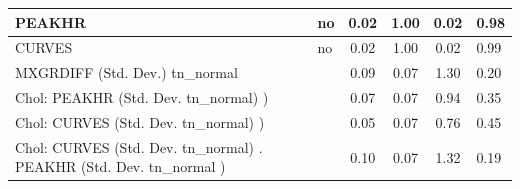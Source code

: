 \begin{table}
\begin{center}
\begin{tabular}{|l|l|c|c|c|l|}
			\hline
			PEAKHR & no & 0.02 & 1.00 & 0.02 & 0.98 \\
			\hline
			CURVES & no & 0.02 & 1.00 & 0.02 & 0.99 \\
			\hline
			MXGRDIFF (Std. Dev.) tn_normal &  & 0.09 & 0.07 & 1.30 & 0.20 \\
			\hline
			 Chol: PEAKHR (Std. Dev. tn_normal) ) &  & 0.07 & 0.07 & 0.94 & 0.35 \\
			\hline
			 Chol: CURVES (Std. Dev. tn_normal) ) &  & 0.05 & 0.07 & 0.76 & 0.45 \\
			\hline
			 Chol: CURVES (Std. Dev. tn_normal) . PEAKHR (Std. Dev.   tn_normal ) &  & 0.10 & 0.07 & 1.32 & 0.19 \\
			\hline
		\end{tabular}
	\end{center}
\end{table}